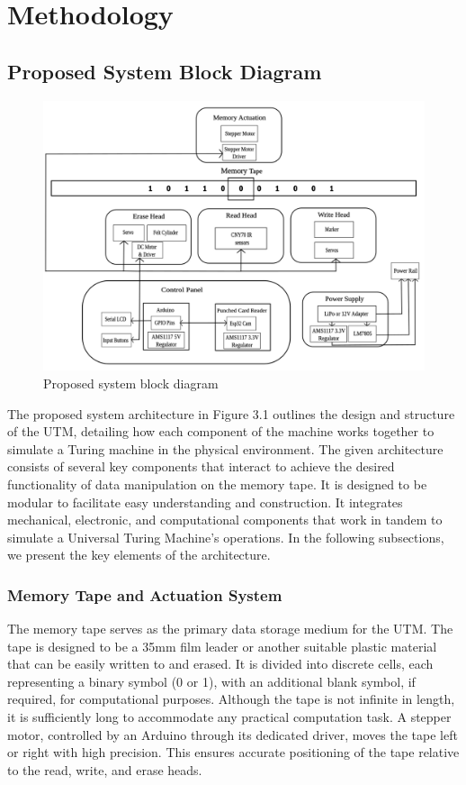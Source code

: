 \chapter{Methodology}

\section{Proposed System Block Diagram}
\begin{figure}[h!]
    \centering
    \includegraphics[width=\textwidth]{content/images/systemBlock.png}
    \caption{Proposed system block diagram}
    \label{fig:systemBlock}
\end{figure}

The proposed system architecture in Figure 3.1 outlines the design and structure of the UTM, detailing how each component of the machine works together to simulate a Turing machine in the physical environment. The given architecture consists of several key components that interact to achieve the desired functionality of data manipulation on the memory tape. It is designed to be modular to facilitate easy understanding and construction. It integrates mechanical, electronic, and computational components that work in tandem to simulate a Universal Turing Machine's operations. In the following subsections, we present the key elements of the architecture.

\subsection{Memory Tape and Actuation System}

The memory tape serves as the primary data storage medium for the UTM. The tape is designed to be a 35mm film leader or another suitable plastic material that can be easily written to and erased. It is divided into discrete cells, each representing a binary symbol (0 or 1), with an additional blank symbol, if required, for computational purposes. Although the tape is not infinite in length, it is sufficiently long to accommodate any practical computation task. A stepper motor, controlled by an Arduino through its dedicated driver, moves the tape left or right with high precision. This ensures accurate positioning of the tape relative to the read, write, and erase heads.

